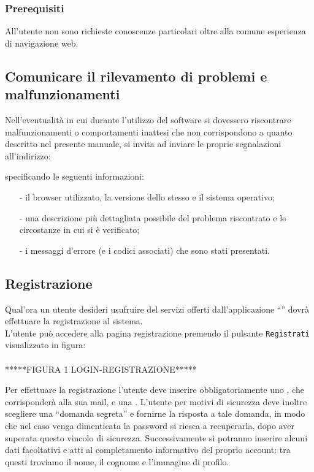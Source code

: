 \subsubsection{Prerequisiti}
All'utente non sono richieste conoscenze particolari oltre alla comune esperienza di navigazione web.

\subsection{Comunicare il rilevamento di problemi e malfunzionamenti}
Nell'eventualità in cui durante l'utilizzo del software \caName{} si dovessero riscontrare malfunzionamenti o comportamenti inattesi che non corrispondono a quanto descritto nel presente manuale, si invita ad inviare le proprie segnalazioni all'indirizzo:
\begin{center}
  \email{}
\end{center}
specificando le seguenti informazioni:
\begin{itemize}[noitemsep,nolistsep]
  \item[-] il browser utilizzato, la versione dello stesso e il sistema operativo;
  \item[-] una descrizione più dettagliata possibile del problema riscontrato e le circostanze in cui si è verificato;
  \item[-] i messaggi d'errore (e i codici associati) che sono stati presentati.
\end{itemize}

\subsection{Registrazione}
Qual'ora un utente desideri usufruire del servizi offerti dall'applicazione ``\caName'' dovrà effettuare la registrazione al sistema.\\
L'utente può accedere alla pagina registrazione premendo il pulsante \texttt{Registrati} visualizzato in figura:
\\\\*****FIGURA 1 LOGIN-REGISTRAZIONE*****

Per effettuare la registrazione l'utente deve inserire obbligatoriamente uno \underline{}, che corrisponderà alla sua mail, e una .
L'utente per motivi di sicurezza deve inoltre scegliere una ``domanda segreta'' e fornirne la risposta a tale domanda, in modo che nel caso venga dimenticata la password si riesca a recuperarla, dopo aver superata questo vincolo di sicurezza.
Successivamente si potranno inserire alcuni dati facoltativi e atti al completamento informativo del proprio account: tra questi troviamo il nome, il cognome e l'immagine di profilo.

